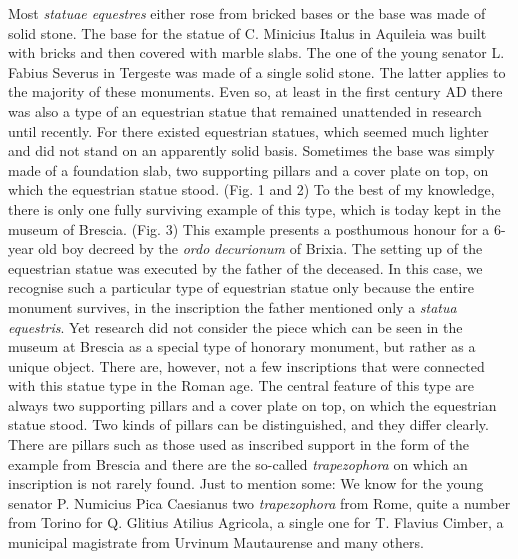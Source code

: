 \documentclass{article}
\begin{document}
Most \textit{statuae equestres }either rose from bricked bases or the base was 
made of solid stone. The base for the statue of C. Minicius Italus in Aquileia 
was built with bricks and then covered with marble slabs. The one of the young 
senator L. Fabius Severus in Tergeste was made of a single solid stone. The latter 
applies to the majority of these monuments. Even so, at least in the first century 
AD there was also a type of an equestrian statue that remained unattended in research 
until recently. For there existed equestrian statues, which seemed much lighter 
and did not stand on an apparently solid basis. Sometimes the base was simply made 
of a foundation slab, two supporting pillars and a cover plate on top, on which 
the equestrian statue stood. (Fig. 1 and 2) To the best of my knowledge, there 
is only one fully surviving example of this type, which is today kept in the museum 
of Brescia. (Fig. 3) This example presents a posthumous honour for a 6-year old 
boy decreed by the \textit{ordo} \textit{decurionum }of Brixia. The setting up 
of the equestrian statue was executed by the father of the deceased. In this case, 
we recognise such a particular type of equestrian statue only because the entire 
monument survives, in the inscription the father mentioned only a \textit{statua 
equestris}. Yet research did not consider the piece which can be seen in the museum 
at Brescia as a special type of honorary monument, but rather as a unique object. 
There are, however, not a few inscriptions that were connected with this statue 
type in the Roman age. The central feature of this type are always two supporting 
pillars and a cover plate on top, on which the equestrian statue stood. Two kinds 
of pillars can be distinguished, and they differ clearly. There are pillars such 
as those used as inscribed support in the form of the example from Brescia and 
there are the so-called \textit{trapezophora }on which an inscription is not rarely 
found. Just to mention some: We know for the young senator P. Numicius Pica Caesianus 
two \textit{trapezophora }from Rome, quite a number from Torino for Q. Glitius 
Atilius Agricola, a single one for T. Flavius Cimber, a municipal magistrate from 
Urvinum Mautaurense and many others.
\end{document}
